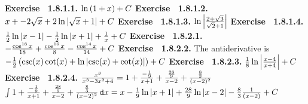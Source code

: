  {\noindent \protect \bf  Exercise ~1.8.1.1.} $\protect \qopname  \relax o{ln}\left (1+x\right )+C$ \protect \newline  \protect \newline  
 {\noindent \protect \bf  Exercise ~1.8.1.2.} $x+ -2\protect \sqrt  {x}+2\protect \qopname  \relax o{ln}{|\protect \sqrt  {x}+1|}+C$ \protect \newline  \protect \newline  
 {\noindent \protect \bf  Exercise ~1.8.1.3.} $\protect \qopname  \relax o{ln}\left | \protect \frac  { 2+\protect \sqrt  {3}}{\protect \sqrt  {2} +1} \right |$ \protect \newline  \protect \newline  
 {\noindent \protect \bf  Exercise ~1.8.1.4.} $\protect \frac  {1}{2}\protect \qopname  \relax o{ln}{|x-1|}-\protect \frac  {1}{2}\protect \qopname  \relax o{ln}{|x+1|} +\protect \frac  {1}{x} +C$ \protect \newline  \protect \newline  
 {\noindent \protect \bf  Exercise ~1.8.2.1.} $-\protect \frac  {\protect \qopname  \relax o{cos}^{18}{x}}{18}+ \protect \frac  {\protect \qopname  \relax o{cos}^{16}{x}}{8} - \protect \frac  {\protect \qopname  \relax o{cos}^{14}{x}}{14} + C$ \protect \newline  \protect \newline  
 {\noindent \protect \bf  Exercise ~1.8.2.2.} The antiderivative is $-\protect \frac  {1}{2}\left (\protect \qopname  \relax o{csc}(x)\protect \qopname  \relax o{cot}(x)+\protect \qopname  \relax o{ln}\left |\protect \qopname  \relax o{csc}(x)+\protect \qopname  \relax o{cot}(x)\right |\right )+C$ \protect \newline  \protect \newline  
 {\noindent \protect \bf  Exercise ~1.8.2.3.} $\protect \frac  {1}{8} \protect \qopname  \relax o{ln}\left | \protect \frac  {x-4}{x+4} \right | + C$ \protect \newline  \protect \newline  
 {\noindent \protect \bf  Exercise ~1.8.2.4.} \textbullet $ \protect \frac  {x^3}{x^3-3x^2+4} = 1 + \protect \frac  { -\protect \frac  {1}{9}}{x+1} + \protect \frac  {\protect \frac  {28}{9}}{x-2} + \protect \frac  {\protect \frac  {8}{3}}{(x-2)^2} $ \protect \newline  \textbullet $ \intop {1 + \protect \frac  { -\protect \frac  {1}{9}}{x+1} + \protect \frac  {\protect \frac  {28}{9}}{x-2} + \protect \frac  {\protect \frac  {8}{3}}{(x-2)^2} \mathop {}\protect \tmspace  -\thinmuskip {.1667em}\protect \mathtt  {d}x} = x -\protect \frac  {1}{9} \protect \qopname  \relax o{ln}{|x+1|} + \protect \frac  {28}{9} \protect \qopname  \relax o{ln}{|x-2|} - \protect \frac  {8}{3} \protect \frac  {1}{(x-2)} + C$  \protect \newline  \protect \newline  
